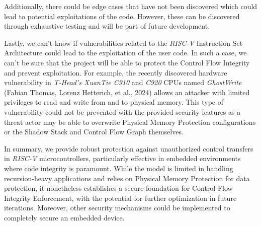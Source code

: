 Additionally, there could be edge cases that have not been discovered which could
lead to potential exploitations of the code. However, these can be discovered through
exhaustive testing and will be part of future development.

Lastly, we can't know if vulnerabilities related to the \textit{RISC-V} Instruction
Set Architecture could lead to the exploitation of the user code. In such a case,
we can't be sure that the project will be able to protect the Control Flow Integrity
and prevent exploitation. For example, the recently discovered hardware vulnerability
in \textit{T-Head's XuanTie C910} and \textit{C920} CPUs named \textit{GhostWrite}\cite{riscvuzz}
(Fabian Thomas, Lorenz Hetterich, et al., 2024) allows an attacker with limited privileges
to read and write from and to physical memory. This type of vulnerability could
not be prevented with the provided security features as a threat actor may be
able to overwrite Physical Memory Protection configurations or the Shadow Stack
and Control Flow Graph themselves.

In summary, we provide robust protection against unauthorized control transfers in
\textit{RISC-V} microcontrollers, particularly effective in embedded environments
where code integrity is paramount. While the model is limited in handling
recursion-heavy applications and relies on Physical Memory Protection for data
protection, it nonetheless establishes a secure foundation for Control Flow Integrity
Enforcement, with the potential for further optimization in future iterations. Moreover,
other security mechanisms could be implemented to completely secure an embedded
device.